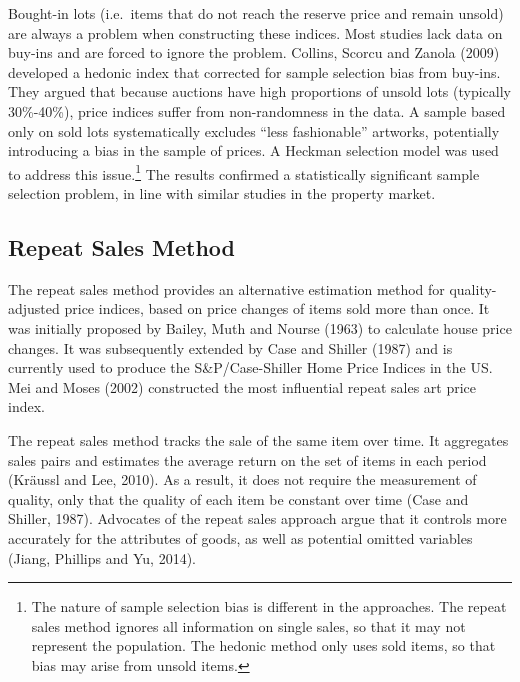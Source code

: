 \documentclass[12pt,]{article}
\let\rmarkdownfootnote\footnote%
\def\footnote{\protect\rmarkdownfootnote}
\begin{document}
Bought-in lots (i.e.~items that do not reach the reserve price and
remain unsold) are always a problem when constructing these indices.
Most studies lack data on buy-ins and are forced to ignore the problem.
Collins, Scorcu and Zanola (2009) developed a hedonic index that
corrected for sample selection bias from buy-ins. They argued that
because auctions have high proportions of unsold lots (typically
30\%-40\%), price indices suffer from non-randomness in the data. A
sample based only on sold lots systematically excludes ``less
fashionable'' artworks, potentially introducing a bias in the sample of
prices. A Heckman selection model was used to address this
issue.\footnote{The nature of sample selection bias is different in the
  approaches. The repeat sales method ignores all information on single
  sales, so that it may not represent the population. The hedonic method
  only uses sold items, so that bias may arise from unsold items.} The
results confirmed a statistically significant sample selection problem,
in line with similar studies in the property market.

\subsection{Repeat Sales Method}\label{repeat-sales-method}

The repeat sales method provides an alternative estimation method for
quality-adjusted price indices, based on price changes of items sold
more than once. It was initially proposed by Bailey, Muth and Nourse
(1963) to calculate house price changes. It was subsequently extended by
Case and Shiller (1987) and is currently used to produce the
S\&P/Case-Shiller Home Price Indices in the US. Mei and Moses (2002)
constructed the most influential repeat sales art price index.

The repeat sales method tracks the sale of the same item over time. It
aggregates sales pairs and estimates the average return on the set of
items in each period (Kräussl and Lee, 2010). As a result, it does not
require the measurement of quality, only that the quality of each item
be constant over time (Case and Shiller, 1987). Advocates of the repeat
sales approach argue that it controls more accurately for the attributes
of goods, as well as potential omitted variables (Jiang, Phillips and
Yu, 2014).
\end{document}
